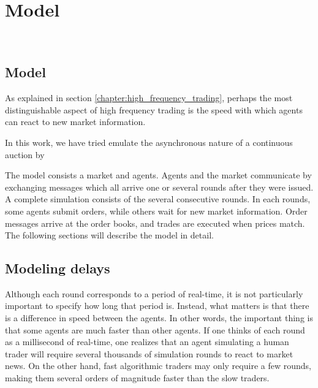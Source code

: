 
\chapter{Model} %

\label{chapter:model} %
$\frac{}{}$
	

\section{Model}




As explained in section \ref{chapter:high_frequency_trading}, perhaps the most distinguishable aspect of high frequency trading is the speed with which agents can react to new market information. 


In this work, we have tried emulate the asynchronous nature of a continuous auction by 




The model consists a market and agents. Agents and the market communicate by exchanging messages which all arrive one or several rounds after they were issued. A complete simulation consists of the several consecutive rounds. In each rounds, some agents submit orders, while others wait for new market information. Order messages arrive at the order books, and trades are executed when prices match.  The following sections will describe the model in detail.

\section{Modeling delays}

Although each round corresponds to a period of real-time, it is not particularly important to specify how long that period is. Instead, what matters is that there is a difference in speed between the agents. In other words, the important thing is that some agents are much faster than other agents. If one thinks of each round as a millisecond of real-time, one realizes that an agent simulating a human trader will require several thousands of simulation rounds to react to market news. On the other hand, fast algorithmic traders may only require a few rounds, making them several orders of magnitude faster than the slow traders. 

